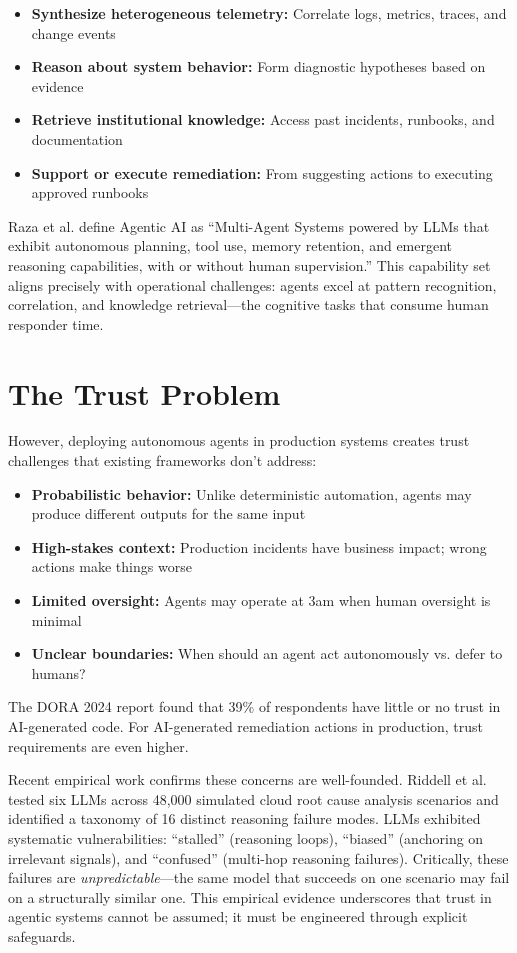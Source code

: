 \begin{itemize}
    \item \textbf{Synthesize heterogeneous telemetry:} Correlate logs, metrics, traces, and change events
    \item \textbf{Reason about system behavior:} Form diagnostic hypotheses based on evidence
    \item \textbf{Retrieve institutional knowledge:} Access past incidents, runbooks, and documentation
    \item \textbf{Support or execute remediation:} From suggesting actions to executing approved runbooks
\end{itemize}

Raza et al. \citep{raza2025} define Agentic AI as ``Multi-Agent Systems powered by LLMs that exhibit autonomous planning, tool use, memory retention, and emergent reasoning capabilities, with or without human supervision.'' This capability set aligns precisely with operational challenges: agents excel at pattern recognition, correlation, and knowledge retrieval---the cognitive tasks that consume human responder time.

\section{The Trust Problem}
\label{sec:trust-problem-intro}

However, deploying autonomous agents in production systems creates trust challenges that existing frameworks don't address:

\begin{itemize}
    \item \textbf{Probabilistic behavior:} Unlike deterministic automation, agents may produce different outputs for the same input
    \item \textbf{High-stakes context:} Production incidents have business impact; wrong actions make things worse
    \item \textbf{Limited oversight:} Agents may operate at 3am when human oversight is minimal
    \item \textbf{Unclear boundaries:} When should an agent act autonomously vs. defer to humans?
\end{itemize}

The DORA 2024 report found that 39\% of respondents have little or no trust in AI-generated code. For AI-generated remediation actions in production, trust requirements are even higher.

Recent empirical work confirms these concerns are well-founded. Riddell et al. \citep{riddell2026} tested six LLMs across 48,000 simulated cloud root cause analysis scenarios and identified a taxonomy of 16 distinct reasoning failure modes. LLMs exhibited systematic vulnerabilities: ``stalled'' (reasoning loops), ``biased'' (anchoring on irrelevant signals), and ``confused'' (multi-hop reasoning failures). Critically, these failures are \textit{unpredictable}---the same model that succeeds on one scenario may fail on a structurally similar one. This empirical evidence underscores that trust in agentic systems cannot be assumed; it must be engineered through explicit safeguards.

